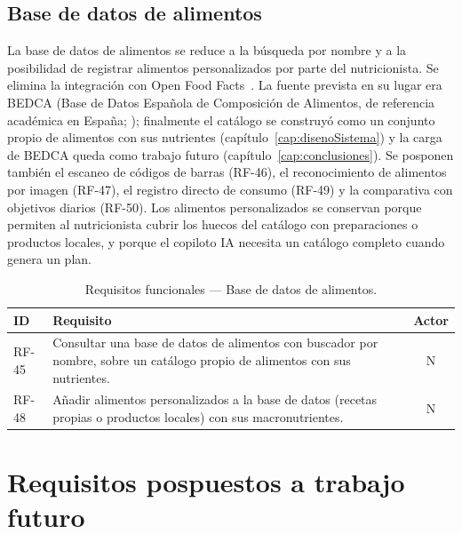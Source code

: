 \subsection{Base de datos de alimentos}

La base de datos de alimentos se reduce a la búsqueda por nombre y a la posibilidad de registrar alimentos personalizados por parte del nutricionista. Se elimina la integración con Open Food Facts~\citep{openfoodfacts}. La fuente prevista en su lugar era BEDCA (Base de Datos Española de Composición de Alimentos, de referencia académica en España; \citealp{bedca}); finalmente el catálogo se construyó como un conjunto propio de alimentos con sus nutrientes (capítulo~\ref{cap:disenoSistema}) y la carga de BEDCA queda como trabajo futuro (capítulo~\ref{cap:conclusiones}). Se posponen también el escaneo de códigos de barras (RF-46), el reconocimiento de alimentos por imagen (RF-47), el registro directo de consumo (RF-49) y la comparativa con objetivos diarios (RF-50). Los alimentos personalizados se conservan porque permiten al nutricionista cubrir los huecos del catálogo con preparaciones o productos locales, y porque el copiloto IA necesita un catálogo completo cuando genera un plan.

\begin{table}[htbp]
\centering
\small
\begin{tabular}{|l|p{10.5cm}|c|}
\hline
\textbf{ID} & \textbf{Requisito} & \textbf{Actor} \\
\hline
RF-45 & Consultar una base de datos de alimentos con buscador por nombre, sobre un catálogo propio de alimentos con sus nutrientes. & N \\
\hline
RF-48 & Añadir alimentos personalizados a la base de datos (recetas propias o productos locales) con sus macronutrientes. & N \\
\hline
\end{tabular}
\caption{Requisitos funcionales --- Base de datos de alimentos.}
\label{tab:rf-alimentos}
\end{table}

\section{Requisitos pospuestos a trabajo futuro}
\label{sec:rfPospuestos}

